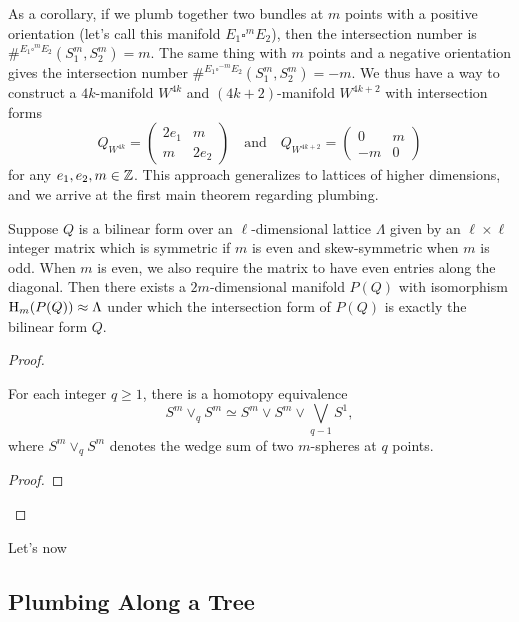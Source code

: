 As a corollary, if we plumb together two bundles at $m$ points with a positive orientation (let's call this manifold $E_1\square^m E_2$), then the intersection number is $\#^{E_1\square^m E_2}(S^m_1, S^m_2)=m$. The same thing with $m$ points and a negative orientation gives the intersection number $\#^{E_1\square^{-m} E_2}(S^m_1,S^m_2)=-m$. We thus have a way to construct a $4k$-manifold $W^{4k}$ and $(4k+2)$-manifold $W^{4k+2}$ with intersection forms
\[
	Q_{W^{4k}} = \begin{pmatrix} 2e_1 & m \\ m & 2e_2\end{pmatrix}
	\quad\textrm{and}\quad
	Q_{W^{4k+2}} = \begin{pmatrix} 0 & m \\ -m & 0\end{pmatrix}
\]
for any $e_1, e_2,m\in \mathbb{Z}$. This approach generalizes to lattices of higher dimensions, and we arrive at the first main theorem regarding plumbing.

\begin{theorem}
	Suppose $Q$ is a bilinear form over an $\ell$-dimensional lattice $\Lambda$ given by an $\ell\times \ell$ integer matrix which is symmetric if $m$ is even and skew-symmetric when $m$ is odd. When $m$ is even, we also require the matrix to have even entries along the diagonal. Then there exists a $2m$-dimensional manifold $P(Q)$ with isomorphism $\operatorname{H}_{m}(P(Q))\approx \Lambda$ under which the intersection form of $P(Q)$ is exactly the bilinear form $Q$.
\end{theorem}

\begin{proof}

\begin{lemma}
	For each integer $q\geq 1$, there is a homotopy equivalence
	\[
		S^m\vee_q S^m \simeq S^m\vee S^m \vee \bigvee_{q-1} S^1,
	\]
	where $S^m\vee_q S^m$ denotes the wedge sum of two $m$-spheres at $q$ points.
\end{lemma}

\begin{proof}
\end{proof}

\end{proof}

Let's now 

\subsection{Plumbing Along a Tree}

